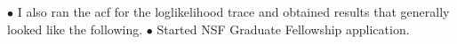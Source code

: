 \documentclass[11pt]{labbook}
\begin{document}
$\bullet$ I also ran the acf for the loglikelihood trace and obtained results that generally looked like the following.
\newline
{}
\newline
$\bullet$ Started NSF Graduate Fellowship application.

\end{document}

